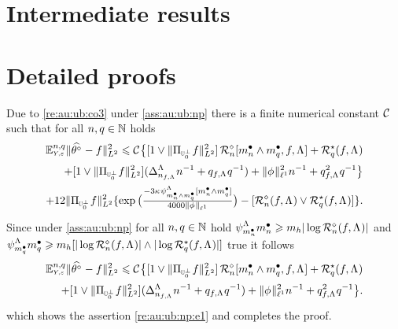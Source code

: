 %                                                                 
% 
%
\section{Intermediate results}

\section{Detailed proofs}

\begin{pro}
Due to \cref{re:au:ub:co3} under
\cref{ass:au:ub:np}
there is a finite numerical constant $\cst{}$ such that for all $\ssY,\ssE\in\Nz$ holds
\begin{multline}\label{pro:au:ub:np:e1}
\FuEx[\ssY,\ssE]{\rY,\rE}\VnormLp{\hxdfPr[]-\xdf}^2\leq
\cst{}\big\{[1\vee\VnormLp{\Proj[{\mHiH[0]^\perp}]\xdf}^2]\,\hRaDi{\sDi{\ssY}\wedge\sDi{\ssE},\xdf,\iSv}+\mRa{\xdf,\iSv}\\
\hfill+[1\vee\VnormLp{\Proj[{\mHiH[0]^\perp}]\xdf}^2](\DipenSv[\ssY_{\xdf,\iSv}]\ssY^{-1}+\ssE_{\xdf,\iSv}\ssE^{-1})+\Vnormlp[1]{\fydf}^2\ssY^{-1}+\ssE_{\xdf,\iSv}^2\ssE^{-1}\big\}
\\
\hfill+12
\VnormLp{\Proj[{\mHiH[0]^\perp}]\xdf}^2\{\exp\big(\tfrac{-3\cpen\cmiSv[\sDi{\ssY}\wedge\sDi{\ssE}][\sDi{\ssY}\wedge\sDi{\ssE}]}{4000\Vnormlp[1]{\fydf}}\big)-[\hRa{\xdf,\iSv}\vee\mRa{\xdf,\iSv}]\}.
\end{multline}
Since under \cref{ass:au:ub:np} for all 
$\ssY,\ssE\in\Nz$ hold
$\cmiSv[\sDi{\ssY}]\sDi{\ssY}\geq\Di_{\ydf}|\log\hRa{\xdf,\iSv}|$ and
$\cmiSv[\sDi{\ssE}]\sDi{\ssE}\geq \Di_{\ydf}[|\log\hRa{\xdf,\iSv}|\wedge|\log\mRa{\xdf,\iSv}|]$  true it follows
\begin{multline}\label{pro:au:ub:np:e2}
\FuEx[\ssY,\ssE]{\rY,\rE}\VnormLp{\hxdfPr[]-\xdf}^2\leq
\cst{}\big\{[1\vee\VnormLp{\Proj[{\mHiH[0]^\perp}]\xdf}^2]\,\hRaDi{\sDi{\ssY}\wedge\sDi{\ssE},\xdf,\iSv}+\mRa{\xdf,\iSv}\\
\hfill+[1\vee\VnormLp{\Proj[{\mHiH[0]^\perp}]\xdf}^2](\DipenSv[\ssY_{\xdf,\iSv}]\ssY^{-1}+\ssE_{\xdf,\iSv}\ssE^{-1})+\Vnormlp[1]{\fydf}^2\ssY^{-1}+\ssE_{\xdf,\iSv}^2\ssE^{-1}\big\}.
\end{multline}
which shows the assertion \eqref{re:au:ub:np:e1} and completes the proof.
\end{pro}


